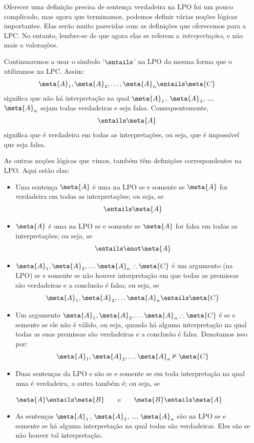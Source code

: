 Oferecer uma definição precisa de sentença verdadeira na LPO foi um pouco complicado, mas agora que terminamos, podemos definir várias noções lógicas importantes.
Elas serão muito parecidas com as definições que oferecemos para a LPC.
No entanto, lembre-se de que agora elas se referem a \emph{interpretações}, e não mais a valorações.

Continuaremos a usar o símbolo `$\entails$' na LPO da mesma forma que o utilizamos na LPC.
Assim:
	$$\meta{A}_1, \meta{A}_2, \ldots, \meta{A}_n \entails\meta{C}$$
significa que não há interpretação na qual $\meta{A}_1$, $\meta{A}_2$, \dots, $\meta{A}_n$ sejam todas verdadeiras e  seja falsa. Consequentemente,
	$$\entails\meta{A}$$
significa que  é verdadeira em todas as interpretações, ou seja, que é impossível que  seja falsa.

As outras noções lógicas que vimos, também têm definições correspondentes na LPO.
Aqui estão elas:

\begin{itemize}
\item Uma sentença  $\meta{A}$ é uma  na LPO se e somente se $\meta{A}$ for verdadeira em todas as interpretações; ou seja, se
$$\entails\meta{A}$$
\item $\meta{A}$ é uma  na LPO se e somente se $\meta{A}$ for falsa em todas as interpretações; ou seja, se
$$\entails\enot\meta{A}$$
\item $\meta{A}_1, \meta{A}_2, \ldots \meta{A}_n \therefore \meta{C}$ é um argumento  (na LPO) se e somente se não houver interpretação em que todas as premissas são verdadeiras e a conclusão é falsa; ou seja, se
$$\meta{A}_1,\meta{A}_2,\ldots \meta{A}_n \entails\meta{C}$$

\item Um argumento $\meta{A}_1, \meta{A}_2, \ldots \meta{A}_n \therefore \meta{C}$ é  se e somente se ele não é válido, ou seja, quando há alguma interpretação na qual todas as suas premissas são verdadeiras e a conclusão é falsa.
Denotamos isso por:
$$\meta{A}_1,\meta{A}_2,\ldots \meta{A}_n \nvDash\meta{C}$$
 
\item Duas sentenças da LPO  e  são  se e somente se em toda interpretação na qual uma é verdadeira, a outra também é; ou seja, se
\begin{center}
	$\meta{A}\entails\meta{B}$ \ \ \ e \ \ \ $\meta{B}\entails\meta{A}$
\end{center}

\item As sentenças $\meta{A}_1$, $\meta{A}_2$, \dots, $\meta{A}_n$ são  na LPO se e somente se há alguma interpretação na qual todas são verdadeiras.
Eles são  se não houver tal interpretação.
\end{itemize}



